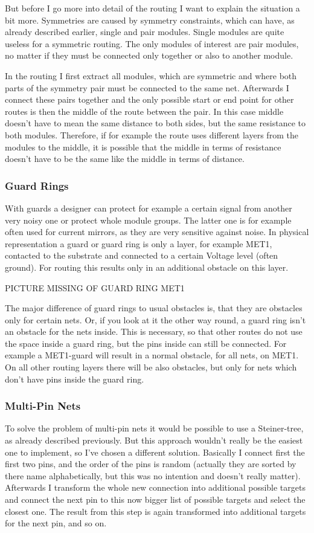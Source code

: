 But before I go more into detail of the routing I want to explain the situation a bit more. Symmetries are caused by symmetry constraints, which can have, as already described earlier, single and pair modules. Single modules are quite useless for a symmetric routing. The only modules of interest are pair modules, no matter if they must be connected only together or also to another module.

In the routing I first extract all modules, which are symmetric and where both parts of the symmetry pair must be connected to the same net. Afterwards I connect these pairs together and the only possible start or end point for other routes is then the middle of the route between the pair. In this case middle doesn't have to mean the same distance to both sides, but the same resistance to both modules. Therefore, if for example the route uses different layers from the modules to the middle, it is possible that the middle in terms of resistance doesn't have to be the same like the middle in terms of distance.

\subsubsection{Guard Rings}
With guards a designer can protect for example a certain signal from another very noisy one or protect whole module groups. The latter one is for example often used for current mirrors, as they are very sensitive against noise. In physical representation a guard or guard ring is only a layer, for example MET1, contacted to the substrate and connected to a certain Voltage level (often ground). For routing this results only in an additional obstacle on this layer.

PICTURE MISSING OF GUARD RING MET1

The major difference of guard rings to usual obstacles is, that they are obstacles only for certain nets. Or, if you look at it the other way round, a guard ring isn't an obstacle for the nets inside. This is necessary, so that other routes do not use the space inside a guard ring, but the pins inside can still be connected. For example a MET1-guard will result in a normal obstacle, for all nets, on MET1. On all other routing layers there will be also obstacles, but only for nets which don't have pins inside the guard ring.

\subsubsection{Multi-Pin Nets}
To solve the problem of multi-pin nets it would be possible to use a Steiner-tree, as already described previously. But this approach wouldn't really be the easiest one to implement, so I've chosen a different solution. Basically I connect first the first two pins, and the order of the pins is random (actually they are sorted by there name alphabetically, but this was no intention and doesn't really matter). Afterwards I transform the whole new connection into additional possible targets and connect the next pin to this now bigger list of possible targets and select the closest one. The result from this step is again transformed into additional targets for the next pin, and so on.


